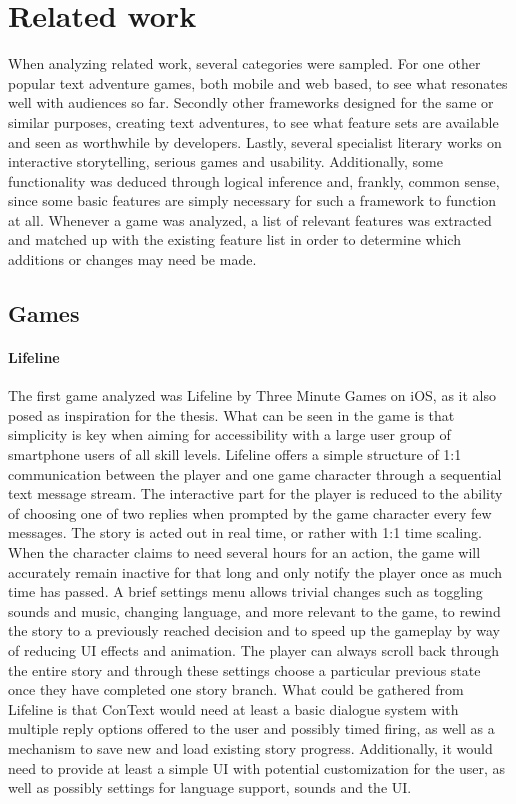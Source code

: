 \section{Related work}
When analyzing related work, several categories were sampled. For one other popular text adventure games, both mobile and web based, to see what resonates well with audiences so far. Secondly other frameworks designed for the same or similar purposes, creating text adventures, to see what feature sets are available and seen as worthwhile by developers. Lastly, several specialist literary works on interactive storytelling, serious games and usability. Additionally, some functionality was deduced through logical inference and, frankly, common sense, since some basic features are simply necessary for such a framework to function at all.
Whenever a game was analyzed, a list of relevant features was extracted and matched up with the existing feature list in order to determine which additions or changes may need be made.

\subsection{Games}
\paragraph{Lifeline}
The first game analyzed was Lifeline by Three Minute Games on iOS, as it also posed as inspiration for the thesis. What can be seen in the game is that simplicity is key when aiming for accessibility with a large user group of smartphone users of all skill levels. Lifeline offers a simple structure of 1:1 communication between the player and one game character through a sequential text message stream. The interactive part for the player is reduced to the ability of choosing one of two replies when prompted by the game character every few messages. 
The story is acted out in real time, or rather with 1:1 time scaling. When the character claims to need several hours for an action, the game will accurately remain inactive for that long and only notify the player once as much time has passed.
A brief settings menu allows trivial changes such as toggling sounds and music, changing language, and more relevant to the game, to rewind the story to a previously reached decision and to speed up the gameplay by way of reducing UI effects and animation. 
The player can always scroll back through the entire story and through these settings choose a particular previous state once they have completed one story branch. 
What could be gathered from Lifeline is that ConText would need at least a basic dialogue system with multiple reply options offered to the user and possibly timed firing, as well as a mechanism to save new and load existing story progress. Additionally, it would need to provide at least a simple UI with potential customization for the user, as well as possibly settings for language support, sounds and the UI.
